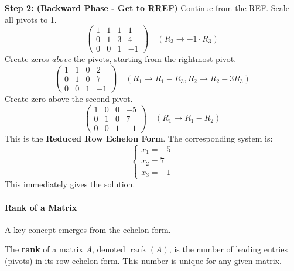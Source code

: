 \documentclass[oneside]{book}
\begin{document}
\textbf{Step 2: (Backward Phase - Get to RREF)}
Continue from the REF. Scale all pivots to 1.
\[
\left(\begin{array}{ccc|c}
1 & 1 & 1 & 1 \\
0 & 1 & 3 & 4 \\
0 & 0 & 1 & -1
\end{array}\right) \quad (R_3 \to -1 \cdot R_3)
\]
Create zeros \emph{above} the pivots, starting from the rightmost pivot.
\[
\left(\begin{array}{ccc|c}
1 & 1 & 0 & 2 \\
0 & 1 & 0 & 7 \\
0 & 0 & 1 & -1
\end{array}\right) \quad (R_1 \to R_1 - R_3, R_2 \to R_2 - 3R_3)
\]
Create zero above the second pivot.
\[
\left(\begin{array}{ccc|c}
1 & 0 & 0 & -5 \\
0 & 1 & 0 & 7 \\
0 & 0 & 1 & -1
\end{array}\right) \quad (R_1 \to R_1 - R_2)
\]
This is the \textbf{Reduced Row Echelon Form}. The corresponding system is:
\[
\begin{cases}
x_1 = -5 \\
x_2 = 7 \\
x_3 = -1
\end{cases}
\]
This immediately gives the solution.

\newpage

\paragraph{Rank of a Matrix}
A key concept emerges from the echelon form.

\begin{definition}
The \textbf{rank} of a matrix $A$, denoted $\operatorname{rank}(A)$, is the number of leading entries (pivots) in its row echelon form. This number is unique for any given matrix.
\end{definition}
\end{document}

